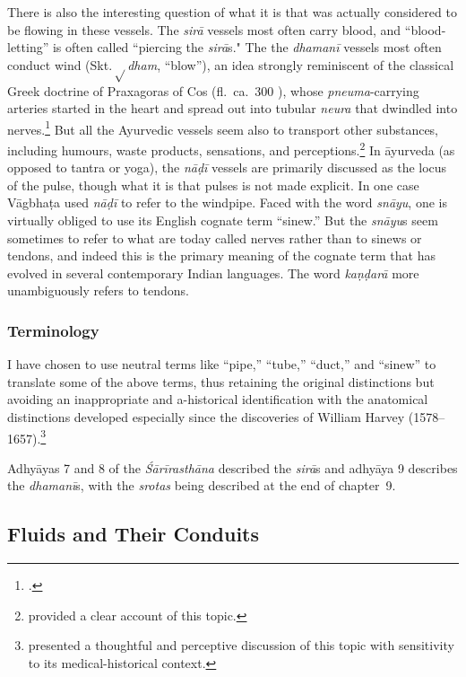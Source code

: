 \begin{refsection}
\label{intro:tubes} There is also the interesting question of what it
is that was actually considered to be flowing in these vessels.  The
\emph{sirā} vessels most often carry blood, and “blood-letting” is
often called “piercing the \emph{sirā}s."  The the \emph{dhamanī}
vessels most often conduct wind (Skt.\,{\small$\sqrt{}$}\emph{dham},
“blow”), an idea strongly reminiscent of the classical Greek doctrine
of Praxagoras of Cos (fl.\ ca.\ 300 \BCE), whose
\emph{pneuma}-carrying arteries started in the heart and spread out
into tubular \emph{neura} that dwindled into
nerves.\footnote{\cites[17--19,
        49--53]{stec-1958}[137]{phil-1973}[137--159 et passim]{wals-2016}.}
But all the Ayurvedic vessels seem also to transport other substances,
including humours, waste products, sensations, and
perceptions.\footnote{\citet[344--52]{dasg-hist} provided a clear
    account of this topic.} In āyurveda (as opposed to tantra or yoga),
the \emph{nāḍī} vessels are primarily discussed as the locus of the
pulse, though what it is that pulses is not made explicit.  In one
case Vāgbhaṭa used \emph{nāḍī} to refer to the windpipe.  Faced with
the word \emph{snāyu}, one is virtually obliged to use its English
cognate term “sinew.”  But the \emph{snāyu}s seem sometimes to refer
to what are today called nerves rather than to sinews or tendons, and
indeed this is the primary meaning of the cognate term that has
evolved in several contemporary Indian languages. The word
\emph{kaṇḍarā} more unambiguously refers to tendons.

\subsubsection{Terminology}

I have chosen to use neutral terms like “pipe,” “tube,” “duct,” and
“sinew” to translate some of the above terms, thus retaining the
original distinctions but avoiding an inappropriate and a-historical
identification with the anatomical distinctions developed especially
since the discoveries of William Harvey 
(1578--1657).\footnote{\citet[27--29]{kutu-1962} presented a thoughtful and 
perceptive discussion of this topic with sensitivity to its medical-historical 
context.}

Adhyāyas 7 and 8 of the \emph{Śārīrasthāna} described the \emph{sirā}s
and adhyāya 9 describes the \emph{dhamanī}s, with the \emph{srotas} being
described at the end of chapter~9.

\subsection{Fluids and Their Conduits}


\end{refsection}
